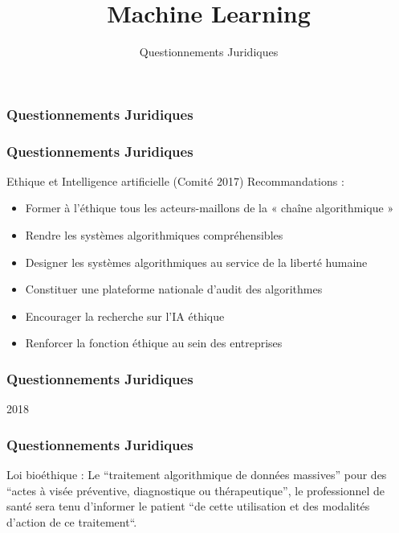 \documentclass{formation}
\title{Machine Learning}
\subtitle{Questionnements Juridiques}
\begin{document}
\maketitle

\begin{frame}
  \frametitle{Questionnements Juridiques}
\end{frame}

\begin{frame}
  \frametitle{Questionnements Juridiques}
  Ethique et Intelligence artificielle (Comité 2017)
  Recommandations :
  \begin{itemize}
  \item Former à l’éthique tous les acteurs-maillons de la « chaîne algorithmique » 
  \item Rendre les systèmes algorithmiques compréhensibles
  \item Designer les systèmes algorithmiques au service de la liberté humaine
  \item Constituer une plateforme nationale d’audit des algorithmes
  \item Encourager la recherche sur l’IA éthique
  \item Renforcer la fonction éthique au sein des entreprises
  \end{itemize}
\end{frame}

\begin{frame}
  \frametitle{Questionnements Juridiques}
  2018
\end{frame}

\begin{frame}
  \frametitle{Questionnements Juridiques}
  Loi bioéthique :
  Le ``traitement algorithmique de données massives'' pour des ``actes à visée préventive, diagnostique ou thérapeutique'', le professionnel de santé sera tenu d'informer le patient ``de cette utilisation et des modalités d’action de ce traitement``.
\end{frame}
\end{document}
